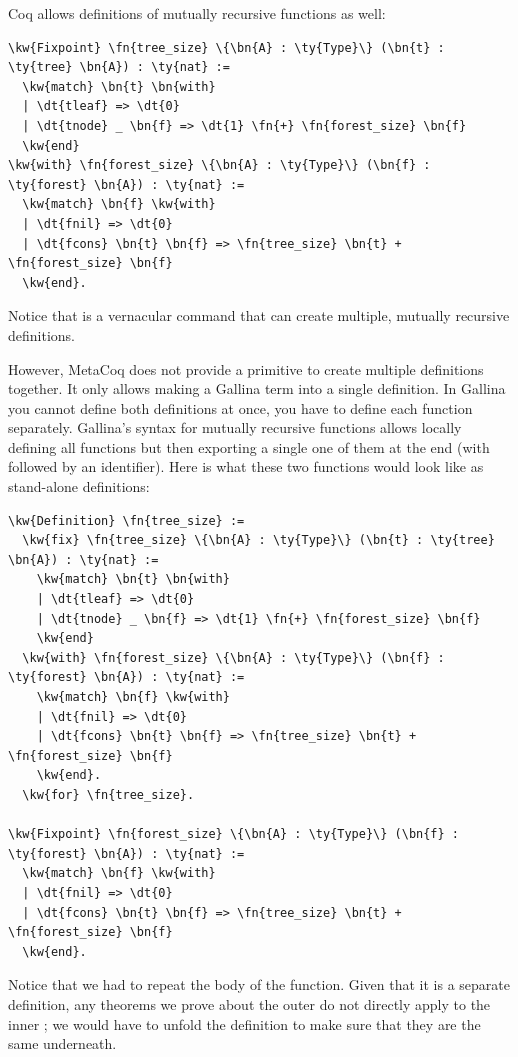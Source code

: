 Coq allows definitions of mutually recursive functions as well:

\begin{Verbatim}
\kw{Fixpoint} \fn{tree_size} \{\bn{A} : \ty{Type}\} (\bn{t} : \ty{tree} \bn{A}) : \ty{nat} :=
  \kw{match} \bn{t} \bn{with}
  | \dt{tleaf} => \dt{0}
  | \dt{tnode} _ \bn{f} => \dt{1} \fn{+} \fn{forest_size} \bn{f}
  \kw{end}
\kw{with} \fn{forest_size} \{\bn{A} : \ty{Type}\} (\bn{f} : \ty{forest} \bn{A}) : \ty{nat} :=
  \kw{match} \bn{f} \kw{with}
  | \dt{fnil} => \dt{0}
  | \dt{fcons} \bn{t} \bn{f} => \fn{tree_size} \bn{t} + \fn{forest_size} \bn{f}
  \kw{end}.
\end{Verbatim}

Notice that  is a vernacular command that can create multiple, mutually recursive definitions. 

However, MetaCoq does not provide a \TemplateMonad{} \gls{primitive} to create multiple definitions together. It only allows making a \gls{Gallina} term into a single definition. In \gls{Gallina} you cannot define both definitions at once, you have to define each function separately. \gls{Gallina}'s syntax for mutually recursive functions allows locally defining all functions but then exporting a single one of them at the end (with  followed by an identifier). Here is what these two functions would look like as stand-alone definitions:

\begin{Verbatim}
\kw{Definition} \fn{tree_size} :=
  \kw{fix} \fn{tree_size} \{\bn{A} : \ty{Type}\} (\bn{t} : \ty{tree} \bn{A}) : \ty{nat} :=
    \kw{match} \bn{t} \bn{with}
    | \dt{tleaf} => \dt{0}
    | \dt{tnode} _ \bn{f} => \dt{1} \fn{+} \fn{forest_size} \bn{f}
    \kw{end}
  \kw{with} \fn{forest_size} \{\bn{A} : \ty{Type}\} (\bn{f} : \ty{forest} \bn{A}) : \ty{nat} :=
    \kw{match} \bn{f} \kw{with}
    | \dt{fnil} => \dt{0}
    | \dt{fcons} \bn{t} \bn{f} => \fn{tree_size} \bn{t} + \fn{forest_size} \bn{f}
    \kw{end}.
  \kw{for} \fn{tree_size}.

\kw{Fixpoint} \fn{forest_size} \{\bn{A} : \ty{Type}\} (\bn{f} : \ty{forest} \bn{A}) : \ty{nat} :=
  \kw{match} \bn{f} \kw{with}
  | \dt{fnil} => \dt{0}
  | \dt{fcons} \bn{t} \bn{f} => \fn{tree_size} \bn{t} + \fn{forest_size} \bn{f}
  \kw{end}.
\end{Verbatim}

Notice that we had to repeat the body of the  function. Given that it is a separate definition, any theorems we prove about the outer  do not directly apply to the inner ; we would have to unfold the definition to make sure that they are the same underneath.

